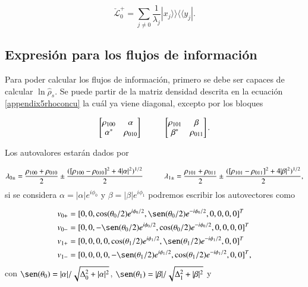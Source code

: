 \begin{appendixs}
\begin{equation*}
    \check{\mathcal{L}}^{+}_{0} = \sum_{j\neq 0}\frac{1}{\lambda_{j}}|x_{j}\rangle \rangle \langle \langle y_{j}|.
\end{equation*}

\label{appendix5drazin}

\subsection{Expresión para los flujos de información}
Para poder calcular los flujos de información, primero se debe ser capaces de calcular $\ln \hat{\rho}_{s}$. Se puede partir de la matriz densidad descrita en la ecuación \ref{appendix5rhoconcu} la cuál ya viene diagonal, excepto por los bloques

\begin{equation*}
    \begin{bmatrix}
        \rho_{100} & \alpha \\
        \alpha^{*} & \rho_{010}
    \end{bmatrix}
    \hspace{10mm}
    \begin{bmatrix}
        \rho_{101} & \beta \\
        \beta^{*} & \rho_{011}
    \end{bmatrix}.
\end{equation*}

Los autovalores estarán dados por

\begin{equation*}
    \lambda_{0\pm} = \frac{ \rho_{100} +\rho_{010} }{2} \pm \frac{( [\rho_{100} - \rho_{010}]^{2} + 4|\alpha|^{2} )^{1/2} }{ 2 }  \hspace{10mm}      \lambda_{1\pm} = \frac{ \rho_{101} +\rho_{011} }{2} \pm \frac{( [\rho_{101} - \rho_{011}]^{2} + 4|\beta|^{2} )^{1/2} }{ 2 }, 
\end{equation*}
si se considera $\alpha = |\alpha|e^{i\phi_{0}}$ y $\beta = |\beta|e^{i\phi_{1}}$ podremos escribir los autovectores como

\begin{align*}
    v_{0+} &  = [0,0,\cos(\theta_{0}/2)e^{i\phi_{0}/2},\sen(\theta_{0}/2)e^{-i\phi_{0}/2},0,0,0,0]^{T} \\
    v_{0-} &  = [0,0,-\sen(\theta_{0}/2)e^{i\phi_{0}/2},\cos(\theta_{0}/2)e^{-i\phi_{0}/2},0,0,0,0]^{T} \\
    v_{1+} &  = [0,0,0,0,\cos(\theta_{1}/2)e^{i\phi_{1}/2},\sen(\theta_{1}/2)e^{-i\phi_{1}/2},0,0]^{T} \\
    v_{1-} &  = [0,0,0,0,-\sen(\theta_{1}/2)e^{i\phi_{1}/2},\cos(\theta_{1}/2)e^{-i\phi_{1}/2},0,0]^{T},                   
\end{align*}
con $\sen(\theta_{0}) = |\alpha|/\sqrt{\Delta^{2}_{0} + |\alpha|^{2}}$, $\sen(\theta_{1}) = |\beta|/\sqrt{\Delta^{2}_{1} + |\beta|^{2}}$ y


\end{appendixs}
